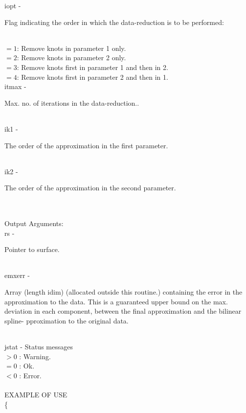        \>\>    {\fov iopt}\> - \>  \begin{minipg2}
                  Flag indicating the order in which the data-reduction
                  is to be performed:
                               \end{minipg2}\\[0.8ex]
          \>\>\>\> $=1$: Remove knots in parameter 1 only.\\
          \>\>\>\> $=2$: Remove knots in parameter 2 only.\\
          \>\>\>\> $=3$: Remove knots first in parameter 1 and then in 2.\\
          \>\>\>\> $=4$: Remove knots first in parameter 2 and then in 1.\\
        \>\>    {\fov itmax}\> - \>  \begin{minipg2}
                    Max. no. of iterations in the data-reduction..
                               \end{minipg2}\\[0.8ex]
        \>\>    {\fov ik1}\> - \>  \begin{minipg2}
                     The order of the approximation in the first
                  parameter.
                               \end{minipg2}\\[0.8ex]
        \>\>    {\fov ik2}\> - \>  \begin{minipg2}
                     The order of the approximation in the second
                  parameter.
                               \end{minipg2}\\[0.8ex]
\\
	\>Output Arguments:\\
        \>\>    {\fov rs}\> - \>  \begin{minipg2}
                     Pointer to surface.
                               \end{minipg2}\\[0.8ex]
        \>\>    {\fov emxerr}\> - \>  \begin{minipg2}
                     Array (length idim) (allocated outside this routine.)
                  containing the error in the approximation to the data.
                  This is a guaranteed upper bound on the max. deviation
                  in each component, between the final approximation
                  and the bilinear spline- pproximation to the original data.
                               \end{minipg2}\\[0.8ex]
        \>\>    {\fov jstat}     \> - \> Status messages\\
                \>\>\>\>\>              $> 0$   : Warning.\\
                \>\>\>\>\>              $= 0$   : Ok.\\
                \>\>\>\>\>              $< 0$   : Error.\\
\\
EXAMPLE OF USE\\
		\>      \{ \\

